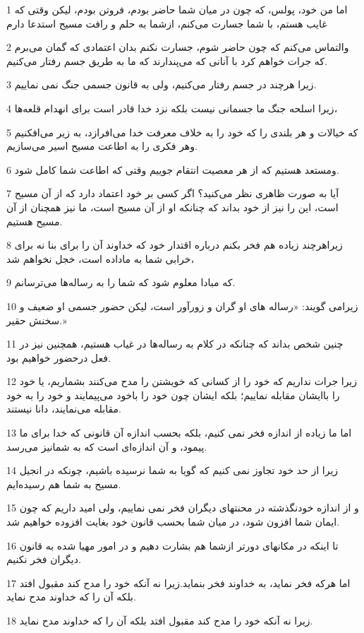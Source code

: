 \par 1 اما من خود، پولس، که چون در میان شما حاضر بودم، فروتن بودم، لیکن وقتی که غایب هستم، با شما جسارت می‌کنم، ازشما به حلم و رافت مسیح استدعا دارم
\par 2 والتماس می‌کنم که چون حاضر شوم، جسارت نکنم بدان اعتمادی که گمان می‌برم که جرات خواهم کرد با آنانی که می‌پندارند که ما به طریق جسم رفتار می‌کنیم.
\par 3 زیرا هرچند در جسم رفتار می‌کنیم، ولی به قانون جسمی جنگ نمی نماییم.
\par 4 زیرا اسلحه جنگ ما جسمانی نیست بلکه نزد خدا قادر است برای انهدام قلعه‌ها،
\par 5 که خیالات و هر بلندی را که خود را به خلاف معرفت خدا می‌افرازد، به زیر می‌افکنیم وهر فکری را به اطاعت مسیح اسیر می‌سازیم.
\par 6 ومستعد هستیم که از هر معصیت انتقام جوییم وقتی که اطاعت شما کامل شود.
\par 7 آیا به صورت ظاهری نظر می‌کنید؟ اگر کسی بر خود اعتماد دارد که از آن مسیح است، این را نیز از خود بداند که چنانکه او از آن مسیح است، ما نیز همچنان از آن مسیح هستیم.
\par 8 زیراهرچند زیاده هم فخر بکنم درباره اقتدار خود که خداوند آن را برای بنا نه برای خرابی شما به ماداده است، خجل نخواهم شد،
\par 9 که مبادا معلوم شود که شما را به رساله‌ها می‌ترسانم.
\par 10 زیرامی گویند: «رساله های او گران و زورآور است، لیکن حضور جسمی او ضعیف و سخنش حقیر.»
\par 11 چنین شخص بداند که چنانکه در کلام به رساله‌ها در غیاب هستیم، همچنین نیز در فعل درحضور خواهیم بود.
\par 12 زیرا جرات نداریم که خود را از کسانی که خویشتن را مدح می‌کنند بشماریم، یا خود را باایشان مقابله نماییم؛ بلکه ایشان چون خود را باخود می‌پیمایند و خود را به خود مقابله می‌نمایند، دانا نیستند.
\par 13 اما ما زیاده از اندازه فخر نمی کنیم، بلکه بحسب اندازه آن قانونی که خدا برای ما پیمود، و آن اندازه‌ای است که به شمانیز می‌رسد.
\par 14 زیرا از حد خود تجاوز نمی کنیم که گویا به شما نرسیده باشیم، چونکه در انجیل مسیح به شما هم رسیده‌ایم.
\par 15 و از اندازه خودنگذشته در محنتهای دیگران فخر نمی نماییم، ولی امید داریم که چون ایمان شما افزون شود، در میان شما بحسب قانون خود بغایت افزوده خواهیم شد.
\par 16 تا اینکه در مکانهای دورتر ازشما هم بشارت دهیم و در امور مهیا شده به قانون دیگران فخر نکنیم.
\par 17 اما هرکه فخر نماید، به خداوند فخر بنماید.زیرا نه آنکه خود را مدح کند مقبول افتد بلکه آن را که خداوند مدح نماید.
\par 18 زیرا نه آنکه خود را مدح کند مقبول افتد بلکه آن را که خداوند مدح نماید.

